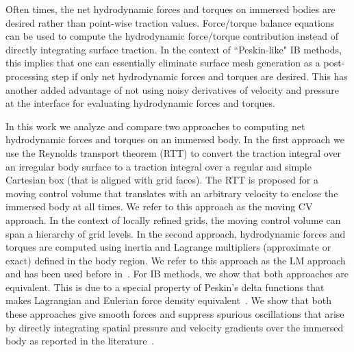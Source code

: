 \documentclass[review]{elsarticle}
\begin{document}
Often times, the net hydrodynamic forces and torques on immersed 
bodies are desired rather than point-wise traction values. Force/torque 
balance equations can be used to compute the hydrodynamic 
force/torque contribution instead of directly integrating surface 
traction. In the context of ``Peskin-like" IB methods, this implies that 
one can essentially eliminate surface mesh generation as a 
post-processing step if only net hydrodynamic forces and torques 
are desired. This has another added advantage of not using noisy 
derivatives of velocity and pressure at the interface for evaluating 
hydrodynamic forces and torques. 

In this work we analyze and compare two approaches to computing net hydrodynamic forces and
 torques on an immersed body. In the first approach we use the Reynolds transport theorem 
(RTT) to convert the traction integral over an irregular body surface to a traction integral 
over a regular and simple Cartesian box (that is aligned with grid faces). The RTT is proposed for 
a moving control volume that translates with an arbitrary velocity to enclose the
immersed body at all times. We refer to this approach as the moving 
CV approach. In the context of locally refined grids, the moving 
control volume can span a hierarchy of grid levels. 
In the second approach, hydrodynamic forces and torques are computed using 
inertia and Lagrange multipliers (approximate or exact) defined in the body region. 
We refer to this approach as the LM approach and has been used before 
in~\cite{Bhalla13}. For IB methods, we show that both approaches are 
equivalent. This is due to a special property of Peskin's delta functions  
that makes Lagrangian and Eulerian force density equivalent~\cite{Peskin02}.
We show that both these approaches give smooth forces
and suppress spurious oscillations that arise by directly integrating spatial 
pressure and velocity gradients over the immersed body as reported in the
literature~\cite{Lee11}. 
\end{document}
